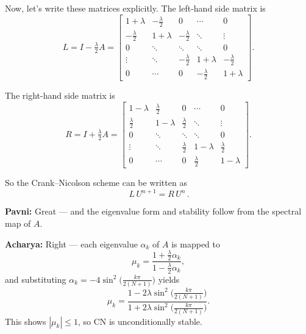 \documentclass[
  letterpaper,
]{book}
\begin{document}
Now, let's write these matrices explicitly. The left-hand side matrix is
\[
L = I-\tfrac{\lambda}{2}A =
\begin{bmatrix}
1+\lambda & -\tfrac{\lambda}{2} & 0 & \cdots & 0\\
-\tfrac{\lambda}{2} & 1+\lambda & -\tfrac{\lambda}{2} & \ddots & \vdots\\
0 & \ddots & \ddots & \ddots & 0\\
\vdots & \ddots & -\tfrac{\lambda}{2} & 1+\lambda & -\tfrac{\lambda}{2}\\
0 & \cdots & 0 & -\tfrac{\lambda}{2} & 1+\lambda
\end{bmatrix}.
\]

The right-hand side matrix is \[
R = I+\tfrac{\lambda}{2}A =
\begin{bmatrix}
1-\lambda & \tfrac{\lambda}{2} & 0 & \cdots & 0\\
\tfrac{\lambda}{2} & 1-\lambda & \tfrac{\lambda}{2} & \ddots & \vdots\\
0 & \ddots & \ddots & \ddots & 0\\
\vdots & \ddots & \tfrac{\lambda}{2} & 1-\lambda & \tfrac{\lambda}{2}\\
0 & \cdots & 0 & \tfrac{\lambda}{2} & 1-\lambda
\end{bmatrix}.
\]

So the Crank--Nicolson scheme can be written as \[
\boxed{\,L\,U^{n+1} = R\,U^n\,}.
\]

\textbf{Pavni:} Great --- and the eigenvalue form and stability follow
from the spectral map of \(A\).

\textbf{Acharya:} Right --- each eigenvalue \(\alpha_k\) of \(A\) is
mapped to \[
\mu_k=\frac{1+\tfrac{\lambda}{2}\alpha_k}{1-\tfrac{\lambda}{2}\alpha_k},
\] and substituting
\(\alpha_k=-4\sin^2\!\big(\tfrac{k\pi}{2(N+1)}\big)\) yields \[
\mu_k=\frac{1-2\lambda \sin^2\!\big(\tfrac{k\pi}{2(N+1)}\big)}
{1+2\lambda \sin^2\!\big(\tfrac{k\pi}{2(N+1)}\big)}.
\] This shows \(|\mu_k|\le1\), so CN is unconditionally stable.
\end{document}
